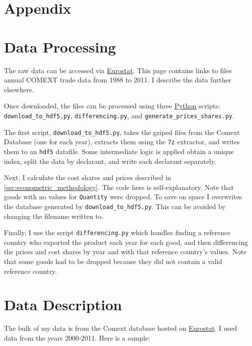 \documentclass[12pt,a4paper]{article}                      %
\begin{document}
\newpage

\section{Appendix}
\label{sec:appendix}





\section{Data Processing}
\label{sec:data_processing}

The raw data can be accessed via \href{http://epp.eurostat.ec.europa.eu/NavTree\_prod/everybody/BulkDownloadListing?sort=1\&dir=comext%2F2012S2%2Fdata}{Eurostat}.  This page contains links to files annual COMEXT trade data from 1988 to 2011.  I describe the data further elsewhere.


Once downloaded, the files can be processed using three \href{www.python.org}{Python} scripts: \texttt{download\_to\_hdf5.py}, \texttt{differencing.py}, and \texttt{generate\_prices\_shares.py}.

 
The first script, \texttt{download\_to\_hdf5.py}, takes the gziped files from the Comext Database (one for each year), extracts them using the \texttt{7z} extractor, and writes them to an \texttt{hdf5} datafile.  Some intermediate logic is applied obtain a unique index, split the data by declarant, and write each declarant separately.


Next, I calculate the cost shares and prices described in \ref{sec:econometric_methodology}.  The code here is self-explanatory. Note that goods with no values for \texttt{Quantity} were dropped. To save on space I overwrites the database generated by \texttt{download\_to\_hdf5.py}.  This can be avoided by changing the filename written to.


Finally, I use the script \texttt{differencing.py} which handles finding a reference country who exported the product each year for each good, and then differencing the prices and cost shares by year and with that reference country's values.  Note that some goods had to be dropped because they did not contain a valid reference country.

\section{Data Description}

The bulk of my data is from the Comext database hosted on \href{http://epp.eurostat.ec.europa.eu/portal/page/portal/eurostat/home/}{Eurostat}.  I used data from the years 2000-2011.  Here is a sample:
\end{document}
